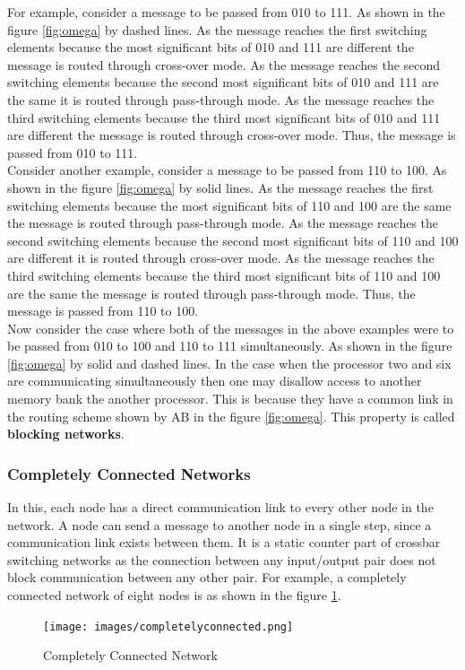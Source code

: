 \documentclass[12pt]{book}
\begin{document}
For example, consider a message to be passed from 010 to 111.
As shown in the figure \ref{fig:omega} by dashed lines. As the message reaches the first switching elements because the most significant bits of 010 and 111 are different
the message is routed through cross-over mode. As the message reaches the second switching elements because the second most significant bits of 010 and 111 are the same it 
is routed through pass-through mode. As the message reaches the third switching elements because the third most significant bits of 010 and 111 are different 
the message is routed through cross-over mode. Thus, the message is passed from 010 to 111. \\
Consider another example, consider a message to be passed from 110 to 100. 
As shown in the figure \ref{fig:omega} by solid lines. As the message reaches the first switching elements because the most significant bits of 110 and 100 are the same
the message is routed through pass-through mode. As the message reaches the second switching elements because the second most significant bits of 110 and 100 are different it
is routed through cross-over mode. As the message reaches the third switching elements because the third most significant bits of 110 and 100 are the same
the message is routed through pass-through mode. Thus, the message is passed from 110 to 100.\\
Now consider the case where both of the messages in the above examples were to be passed from 010 to 100 and 110 to 111 simultaneously.
As shown in the figure \ref{fig:omega} by solid and dashed lines. In the case when the processor two and six are communicating simultaneously
then one may disallow access to another memory bank the another processor. This is because they have a common link in the routing scheme shown by AB in the figure \ref{fig:omega}.
This property is called \textbf{blocking networks}.

\subsubsection{Completely Connected Networks}
In this, each node has a direct communication link to every other node in the network. A node can send a message to another node
in a single step, since a communication link exists between them. 
It is a static counter part of crossbar switching networks as the connection between any input/output pair does not block communication between any other pair.
For example, a completely connected network of eight nodes is as shown in the figure \ref{fig:complete}.
\begin{figure}[H]
    \centering
    \texttt{[image: images/completelyconnected.png]}
    \caption{Completely Connected Network}
    \label{fig:complete}
\end{figure}
\end{document}
